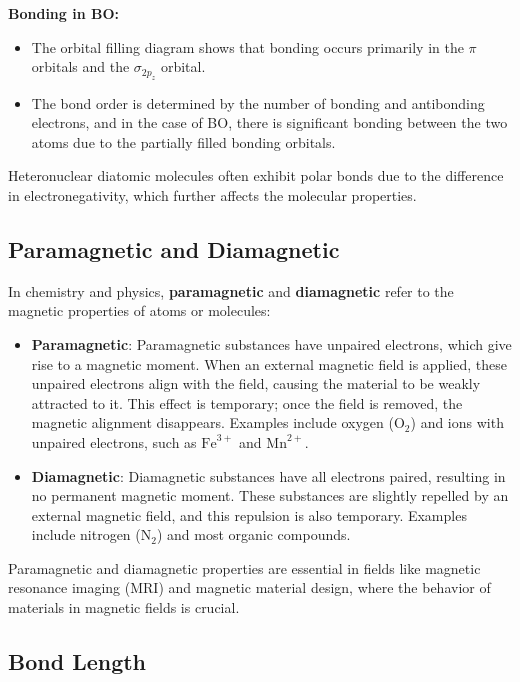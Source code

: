 \documentclass{report}
\begin{document}
\textbf{Bonding in BO:}
\begin{itemize}
	\item The orbital filling diagram shows that bonding occurs primarily in the $\pi$ orbitals and the $\sigma_{2p_z}$ orbital.
	\item The bond order is determined by the number of bonding and antibonding electrons, and in the case of BO, there is significant bonding between the two atoms due to the partially filled bonding orbitals.
\end{itemize}

Heteronuclear diatomic molecules often exhibit polar bonds due to the difference in electronegativity, which further affects the molecular properties.

\subsection{Paramagnetic and Diamagnetic}

In chemistry and physics, \textbf{paramagnetic} and \textbf{diamagnetic} refer to the magnetic properties of atoms or molecules:

\begin{itemize}
	\item \textbf{Paramagnetic}: Paramagnetic substances have unpaired electrons, which give rise to a magnetic moment. When an external magnetic field is applied, these unpaired electrons align with the field, causing the material to be weakly attracted to it. This effect is temporary; once the field is removed, the magnetic alignment disappears. Examples include oxygen (\(\text{O}_2\)) and ions with unpaired electrons, such as \(\text{Fe}^{3+}\) and \(\text{Mn}^{2+}\).
	\item \textbf{Diamagnetic}: Diamagnetic substances have all electrons paired, resulting in no permanent magnetic moment. These substances are slightly repelled by an external magnetic field, and this repulsion is also temporary. Examples include nitrogen (\(\text{N}_2\)) and most organic compounds.
\end{itemize}

Paramagnetic and diamagnetic properties are essential in fields like magnetic resonance imaging (MRI) and magnetic material design, where the behavior of materials in magnetic fields is crucial.

\subsection{Bond Length}
\end{document}
